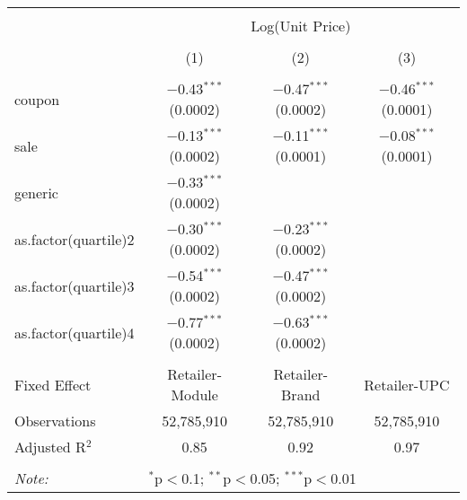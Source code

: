 
\begin{table}[!htbp] \centering 
  \caption{} 
  \label{tab:overallSavings} 
\begin{tabular}{@{\extracolsep{5pt}}lccc} 
\\[-1.8ex]\hline 
\hline \\[-1.8ex] 
 & \multicolumn{3}{c}{Log(Unit Price)} \\ 
\\[-1.8ex] & (1) & (2) & (3)\\ 
\hline \\[-1.8ex] 
 coupon & $-$0.43$^{***}$ (0.0002) & $-$0.47$^{***}$ (0.0002) & $-$0.46$^{***}$ (0.0001) \\ 
  sale & $-$0.13$^{***}$ (0.0002) & $-$0.11$^{***}$ (0.0001) & $-$0.08$^{***}$ (0.0001) \\ 
  generic & $-$0.33$^{***}$ (0.0002) &  &  \\ 
  as.factor(quartile)2 & $-$0.30$^{***}$ (0.0002) & $-$0.23$^{***}$ (0.0002) &  \\ 
  as.factor(quartile)3 & $-$0.54$^{***}$ (0.0002) & $-$0.47$^{***}$ (0.0002) &  \\ 
  as.factor(quartile)4 & $-$0.77$^{***}$ (0.0002) & $-$0.63$^{***}$ (0.0002) &  \\ 
 \hline \\[-1.8ex] 
Fixed Effect & Retailer-Module & Retailer-Brand & Retailer-UPC \\ 
Observations & 52,785,910 & 52,785,910 & 52,785,910 \\ 
Adjusted R$^{2}$ & 0.85 & 0.92 & 0.97 \\ 
\hline 
\hline \\[-1.8ex] 
\textit{Note:}  & \multicolumn{3}{l}{$^{*}$p$<$0.1; $^{**}$p$<$0.05; $^{***}$p$<$0.01} \\ 
\end{tabular} 
\end{table} 
